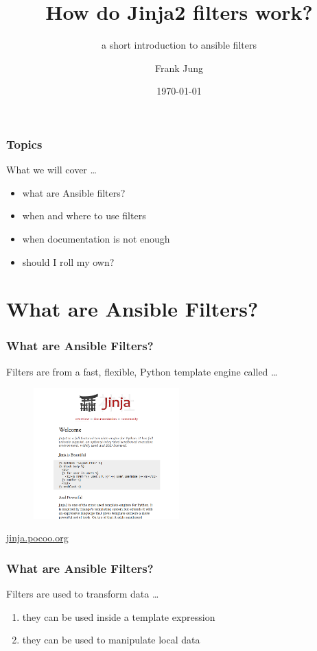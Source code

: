 \documentclass[pdf]{beamer}
\title{How do Jinja2 filters work?}
\subtitle{a short introduction to ansible filters}
\author{Frank Jung}
\institute{frankhjung@linux.com}
\date{ \today }
\begin{document}
\begin{frame}
  \titlepage{}
\end{frame}


\begin{frame}
  \frametitle{Topics}
  What we will cover \ldots
  \pause{}
  \begin{itemize}
    \item what are Ansible filters?
      \pause{}
    \item when and where to use filters
      \pause{}
    \item when documentation is not enough
      \pause{}
    \item should I roll my own?
  \end{itemize}
\end{frame}

\section{What are Ansible Filters?}

\begin{frame}
  \frametitle{What are Ansible Filters?}
  Filters are from a fast, flexible, Python template engine called \ldots
  \pause{}
  \begin{center}
    \begin{figure}
      \includegraphics[width=0.5\textwidth]{jinja.png}
    \end{figure}
    \href{http://jinja.pocoo.org}{jinja.pocoo.org}
  \end{center}
\end{frame}

\begin{frame}
  \frametitle{What are Ansible Filters?}
  Filters are used to transform data \ldots
  \pause{}
  \begin{enumerate}
    \item{they can be used inside a template expression}
      \pause{}
    \item{they can be used to manipulate local data}
  \end{enumerate}
\end{frame}
\end{document}
